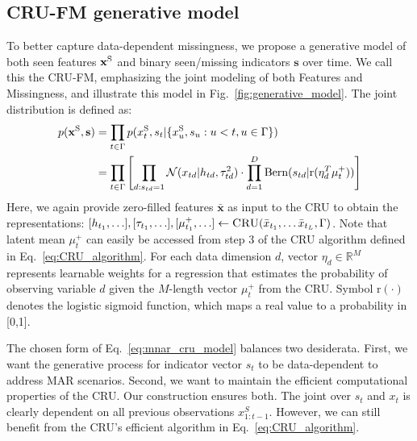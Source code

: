 \subsection{CRU-FM generative model}
\label{sec:CRU_gen_model}
To better capture data-dependent missingness, we propose a generative model of both 
seen features $\mathbf{x^{\text{S}}}$ and binary seen/missing indicators $\mathbf{s}$ over time. We call this the CRU-FM, emphasizing the joint modeling of both Features and Missingness, and illustrate this model in Fig.~\ref{fig:generative_model}.
The joint distribution is defined as:
\begin{align}
   \label{eq:mnar_cru_model}
   p(\mathbf{x^{\text{S}}}, \mathbf{s}) 
   &= 
        \prod_{t \in \Gamma}
            p( x^{\text{S}}_t, s_t | \{  x^{\text{S}}_u, s_u : u < t, u \in \Gamma \} )
    \\ \notag 
   &=
   \prod_{t \in \Gamma} \left[ 
        \prod_{d : s_{td}=1}
        \mathcal{N}( x_{td} | h_{td}, \tau_{td}^2 )
        \cdot 
        \prod_{d=1}^D
        \text{Bern}( s_{td} | \text{r}(\eta_d^T \mu_t^+) )
        \right]
\end{align}
Here, we again provide zero-filled features $\mathbf{\bar{x}}$ as input to the CRU to obtain the representations: $[h_{t_1}, \ldots], [\tau_{t_1}, \ldots], [\mu^+_{t_1}, \ldots] \gets \textsc{CRU}( \bar{x}_{t_1}, \ldots \bar{x}_{t_L}, \Gamma )$. Note that latent mean $\mu_t^+$ can easily be accessed from step 3 of the CRU algorithm defined in Eq.~\ref{eq:CRU_algorithm}.
For each data dimension $d$, vector $\eta_d \in \mathbb{R}^M$ represents learnable weights for a regression that estimates the probability of observing variable $d$ given the $M$-length vector $\mu^+_t$ from the CRU. Symbol $\text{r}(\cdot)$ denotes the logistic sigmoid function, which maps a real value to a probability in [0,1].

The chosen form of Eq.~\eqref{eq:mnar_cru_model} balances two desiderata. First, we want the generative process for indicator vector $s_t$ to be data-dependent to address MAR scenarios. 
Second, we want to maintain the efficient computational properties of the CRU. Our construction ensures both. The joint over $s_t$ and $x_t$ is clearly dependent on all previous observations $x^S_{1:t-1}$.
However, we can still benefit from the CRU's efficient algorithm in Eq.~\eqref{eq:CRU_algorithm}.


